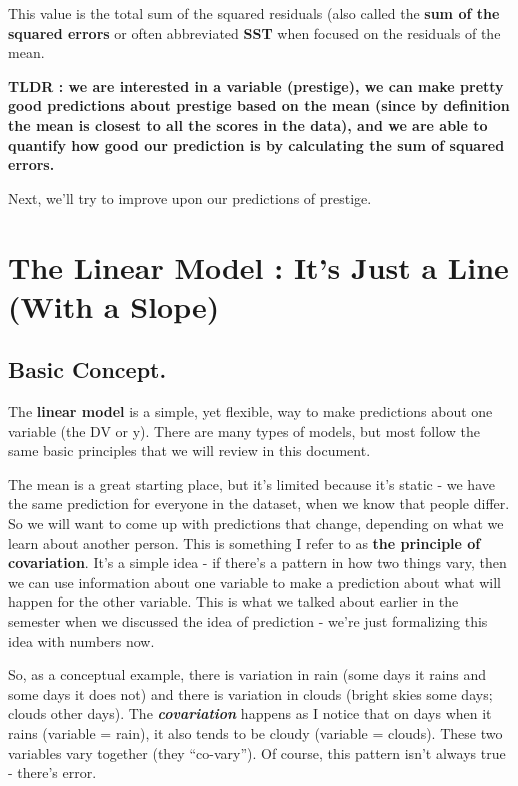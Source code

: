 \documentclass[
  letterpaper,
  DIV=11,
  numbers=noendperiod,
  oneside]{scrreprt}
\begin{document}
This value is the total sum of the squared residuals (also called the
\textbf{sum of the squared errors} or often abbreviated \textbf{SST}
when focused on the residuals of the mean.

\textbf{TLDR : we are interested in a variable (prestige), we can make
pretty good predictions about prestige based on the mean (since by
definition the mean is closest to all the scores in the data), and we
are able to quantify how good our prediction is by calculating the sum
of squared errors.}

Next, we'll try to improve upon our predictions of prestige.

\section{The Linear Model : It's Just a Line (With a
Slope)}\label{the-linear-model-its-just-a-line-with-a-slope}

\subsection{Basic Concept.}\label{basic-concept.}

The \textbf{linear model} is a simple, yet flexible, way to make
predictions about one variable (the DV or y). There are many types of
models, but most follow the same basic principles that we will review in
this document. {}

The mean is a great starting place, but it's limited because it's static
- we have the same prediction for everyone in the dataset, when we know
that people differ. So we will want to come up with predictions that
change, depending on what we learn about another person. This is
something I refer to as \textbf{the principle of covariation}. It's a
simple idea - if there's a pattern in how two things vary, then we can
use information about one variable to make a prediction about what will
happen for the other variable. This is what we talked about earlier in
the semester when we discussed the idea of prediction - we're just
formalizing this idea with numbers now.

So, as a conceptual example, there is variation in rain (some days it
rains and some days it does not) and there is variation in clouds
(bright skies some days; clouds other days). The
\textbf{\emph{covariation}} happens as I notice that on days when it
rains (variable = rain), it also tends to be cloudy (variable = clouds).
These two variables vary together (they ``co-vary''). Of course, this
pattern isn't always true - there's error.
\end{document}
